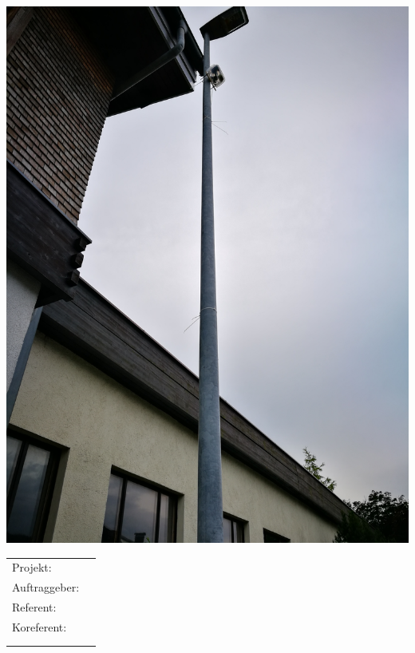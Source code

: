 \begin{titlepage}
\maketitle
\thispagestyle{empty} %

\begin{center}
\includegraphics[height=0.55\textheight]{Deckblatt/FaC_Titelbild.jpg} 
\end{center}

\begin{center}
  \begin{tabular}[t]{ll}
  \\
	Projekt:       & \quad \projektName \\[1.2ex]
	Auftraggeber:  & \quad \auftraggeber\\[1.2ex]
	Referent: 	   & \quad \RefName\\ [1.2ex]
	Koreferent:    & \quad \coRefName\\\\\\ [1.2ex]
  \end{tabular}
\begin{verbatim}

\end{verbatim}

\end{center}
\end{titlepage}
